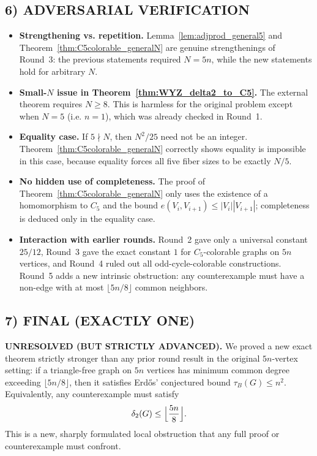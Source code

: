 \subsection*{6) ADVERSARIAL VERIFICATION}
\begin{itemize}
\item \textbf{Strengthening vs. repetition.}  Lemma~\ref{lem:adjprod_general5} and
      Theorem~\ref{thm:C5colorable_generalN} are genuine strengthenings of Round~3: the previous
      statements required $N=5n$, while the new statements hold for arbitrary $N$.
\item \textbf{Small-$N$ issue in Theorem~\ref{thm:WYZ_delta2_to_C5}.}  The external theorem requires
      $N\ge 8$.  This is harmless for the original problem except when $N=5$ (i.e. $n=1$), which was
      already checked in Round~1.
\item \textbf{Equality case.}  If $5\nmid N$, then $N^2/25$ need not be an integer.  Theorem~\ref{thm:C5colorable_generalN}
      correctly shows equality is impossible in this case, because equality forces all five fiber sizes to be
      exactly $N/5$.
\item \textbf{No hidden use of completeness.}  The proof of Theorem~\ref{thm:C5colorable_generalN}
      only uses the existence of a homomorphism to $C_5$ and the bound
      $e(V_i,V_{i+1})\le |V_i||V_{i+1}|$; completeness is deduced only in the equality case.
\item \textbf{Interaction with earlier rounds.}  Round~2 gave only a universal constant $25/12$,
      Round~3 gave the exact constant $1$ for $C_5$-colorable graphs on $5n$ vertices, and Round~4
      ruled out all odd-cycle-colorable constructions.  Round~5 adds a new intrinsic obstruction:
      any counterexample must have a non-edge with at most $\lfloor 5n/8\rfloor$ common neighbors.
\end{itemize}

\subsection*{7) FINAL (EXACTLY ONE)}
\textbf{UNRESOLVED (BUT STRICTLY ADVANCED).}
We proved a new exact theorem strictly stronger than any prior round result in the original
$5n$-vertex setting:
if a triangle-free graph on $5n$ vertices has minimum common degree exceeding $\lfloor 5n/8\rfloor$,
then it satisfies Erd\H{o}s' conjectured bound $\tau_B(G)\le n^2$.
Equivalently, any counterexample must satisfy
\[
\delta_2(G)\le \Bigl\lfloor\frac{5n}{8}\Bigr\rfloor.
\]
This is a new, sharply formulated local obstruction that any full proof or counterexample must confront.

